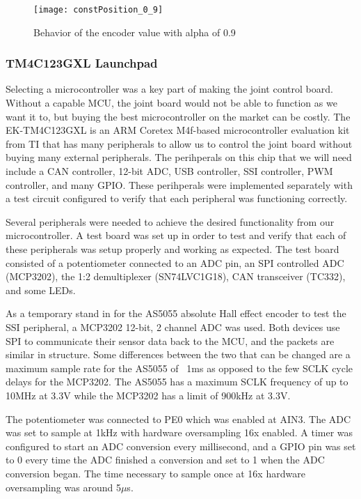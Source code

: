 \begin{figure}[H]
\centering
\texttt{[image: constPosition\_0\_9]}
\caption{Behavior of the encoder value with alpha of 0.9}
\label{fig:constPosition_0_9}
\end{figure}

\subsubsection{TM4C123GXL Launchpad}
Selecting a microcontroller was a key part of making the joint control board. Without a capable MCU, the joint board would not be able to function as we want it to, but buying the best microcontroller on the market can be costly. The EK-TM4C123GXL is an ARM Coretex M4f-based microcontroller evaluation kit from TI that has many peripherals to allow us to control the joint board without buying many external peripherals. The perihperals on this chip that we will need include a CAN controller, 12-bit ADC, USB controller, SSI controller, PWM controller, and many GPIO. These perihperals were implemented separately with a test circuit configured to verify that each peripheral was functioning correctly.

\noindent Several peripherals were needed to achieve the desired functionality from our microcontroller. A test board was set up in order to test and verify that each of these peripherals was setup properly and working as expected. The test board consisted of a potentiometer connected to an ADC pin, an SPI controlled ADC (MCP3202), the 1:2 demultiplexer (SN74LVC1G18), CAN transceiver (TC332), and some LEDs.

\noindent As a temporary stand in for the AS5055 absolute Hall effect encoder to test the SSI peripheral, a MCP3202 12-bit, 2 channel ADC was used. Both devices use SPI to communicate their sensor data back to the MCU, and the packets are similar in structure. Some differences between the two that can be changed are a maximum sample rate for the AS5055 of ~1ms as opposed to the few SCLK cycle delays for the MCP3202. The AS5055 has a maximum SCLK frequency of up to 10MHz at 3.3V while the MCP3202 has a limit of 900kHz at 3.3V. 

\noindent The potentiometer was connected to PE0 which was enabled at AIN3. The ADC was set to sample at 1kHz with hardware oversampling 16x enabled. A timer was configured to start an ADC conversion every millisecond, and a GPIO pin was set to 0 every time the ADC finished a conversion and set to 1 when the ADC conversion began. The time necessary to sample once at 16x hardware oversampling was around 5$\mu$s.

